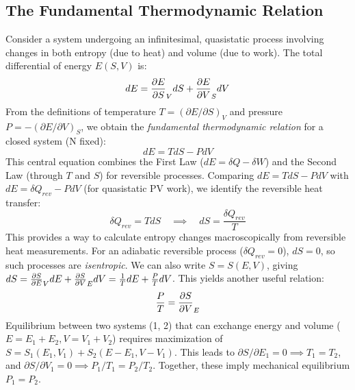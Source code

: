 \documentclass[10pt, letterpaper]{article}
\begin{document}
\subsection{The Fundamental Thermodynamic Relation}
Consider a system undergoing an infinitesimal, quasistatic process involving changes in both entropy (due to heat) and volume (due to work). The total differential of energy $E(S, V)$ is:
\begin{equation*}
    dE = \pdv{E}{S}_{V} dS + \pdv{E}{V}_{S} dV
\end{equation*}
From the definitions of temperature $T = (\partial E / \partial S)_V$ and pressure $P = -(\partial E / \partial V)_S$, we obtain the \textit{fundamental thermodynamic relation} for a closed system (N fixed):
\begin{equation} \label{eq:fundamental_relation}
    \boxed{dE = T dS - P dV}
\end{equation}
This central equation combines the First Law ($dE = \delta Q - \delta W$) and the Second Law (through $T$ and $S$) for reversible processes. Comparing $dE = TdS - PdV$ with $dE = \delta Q_{rev} - P dV$ (for quasistatic PV work), we identify the reversible heat transfer:
\begin{equation}
    \delta Q_{rev} = T dS \quad \implies \quad dS = \frac{\delta Q_{rev}}{T}
\end{equation}
This provides a way to calculate entropy changes macroscopically from reversible heat measurements. For an adiabatic reversible process ($\delta Q_{rev}=0$), $dS=0$, so such processes are \textit{isentropic}.
We can also write $S=S(E,V)$, giving $dS = \pdv{S}{E}_V dE + \pdv{S}{V}_E dV = \frac{1}{T} dE + \frac{P}{T} dV$. This yields another useful relation:
\begin{equation*}
    \frac{P}{T} = \pdv{S}{V}_{E}
\end{equation*}
Equilibrium between two systems (1, 2) that can exchange energy and volume ($E=E_1+E_2, V=V_1+V_2$) requires maximization of $S = S_1(E_1, V_1) + S_2(E-E_1, V-V_1)$. This leads to $\partial S / \partial E_1 = 0 \implies T_1 = T_2$, and $\partial S / \partial V_1 = 0 \implies P_1/T_1 = P_2/T_2$. Together, these imply mechanical equilibrium $P_1 = P_2$.
\end{document}
